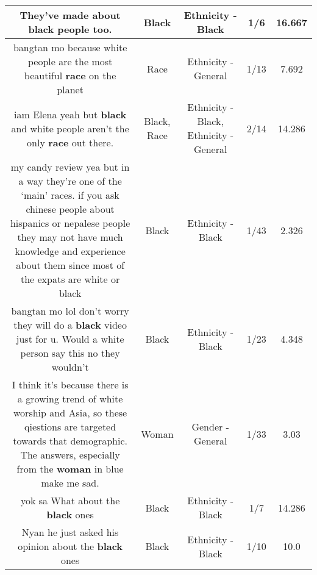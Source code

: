 \documentclass[11pt]{article}
\newlength\mylength
\begin{document}
\begin{center}
\begin{longtable}{|C{.65\mylength}|C{.30\mylength}|C{.12\mylength}|C{.12\mylength}|C{.12\mylength}|}
  \small They've made about \textbf{black} people too.\normalsize   & Black & Ethnicity - Black & 1/6 & 16.667 \\  \hline
  \small bangtan mo because white people are the most beautiful \textbf{race} on the planet\normalsize   & Race & Ethnicity - General & 1/13 & 7.692 \\  \hline
  \small iam Elena yeah but \textbf{black} and white people aren't the only \textbf{race} out there.\normalsize   & Black, Race & Ethnicity - Black, Ethnicity - General & 2/14 & 14.286 \\  \hline
  \small my candy review yea but in a way they're one of the ‘main' races. if you ask chinese people about hispanics or nepalese people they may not have much knowledge and experience about them since most of the expats are white or black\normalsize   & Black & Ethnicity - Black & 1/43 & 2.326 \\  \hline
  \small bangtan mo lol don't worry they will do a \textbf{black} video just for u. Would a white person say this no they wouldn't\normalsize   & Black & Ethnicity - Black & 1/23 & 4.348 \\  \hline
  \small I think it's because there is a growing trend of white worship and Asia, so these qiestions are targeted towards that demographic. The answers, especially from the \textbf{woman} in blue make me sad.\normalsize   & Woman & Gender - General & 1/33 & 3.03 \\  \hline
  \small yok sa What about the \textbf{black} ones\normalsize   & Black & Ethnicity - Black & 1/7 & 14.286 \\  \hline
  \small Nyan he just asked his opinion about the \textbf{black} ones\normalsize   & Black & Ethnicity - Black & 1/10 & 10.0 \\  \hline

\end{longtable}
\end{center}
\end{document}
